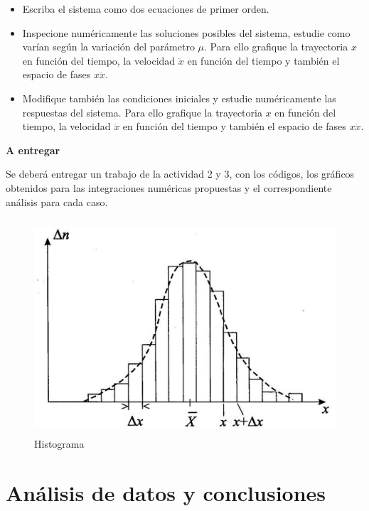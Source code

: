 \documentclass[a4paper,12pt]{article}
\begin{document}
\begin{itemize}
\item Escriba el sistema como dos ecuaciones de primer orden.
\item Inspecione num\'ericamente las soluciones posibles del sistema, estudie como var\'ian seg\'un la variaci\'on del par\'ametro $\mu$. Para ello grafique la trayectoria $x$ en funci\'on del tiempo, la velocidad $\ddot{x}$ en funci\'on del tiempo y tambi\'en el espacio de fases $x  \ddot{x}$.
\item Modifique tambi\'en las condiciones iniciales y estudie num\'ericamente las respuestas del sistema. Para ello grafique la trayectoria $x$ en funci\'on del tiempo, la velocidad $\ddot{x}$ en funci\'on del tiempo y tambi\'en el espacio de fases $x  \ddot{x}$.
\end{itemize}


{\Large \textbf{A entregar}}

Se deber\'a entregar un trabajo de la actividad 2 y 3, con los c\'odigos, los gr\'aficos obtenidos para las integraciones num\'ericas propuestas y el correspondiente an\'alisis para cada caso.



\begin{figure}[H]
\begin{center}
\includegraphics[height=8cm]{histograma.JPG}
\caption[width=5cm]{Histograma}
\label{hcongauss}
\end{center}
\end{figure}




\section{An\'alisis de datos y conclusiones}
\end{document}
